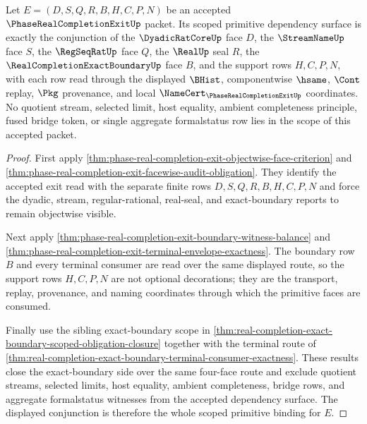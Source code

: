 \begin{theorem}
\label{thm:phase-real-completion-exit-scoped-primitive-dependency-binding}
Let $E=(D,S,Q,R,B,H,C,P,N)$ be an accepted $\PhaseRealCompletionExitUp$ packet. Its scoped primitive dependency surface is exactly the conjunction of the $\DyadicRatCoreUp$ face $D$, the $\StreamNameUp$ face $S$, the $\RegSeqRatUp$ face $Q$, the $\RealUp$ seal $R$, the $\RealCompletionExactBoundaryUp$ face $B$, and the support rows $H,C,P,N$, with each row read through the displayed $\BHist$, componentwise $\hsame$, $\Cont$ replay, $\Pkg$ provenance, and local $\NameCert_{\PhaseRealCompletionExitUp}$ coordinates. No quotient stream, selected limit, host equality, ambient completeness principle, fused bridge token, or single aggregate formalstatus row lies in the scope of this accepted packet.
\end{theorem}
\begin{proof}
First apply \autoref{thm:phase-real-completion-exit-objectwise-face-criterion} and \autoref{thm:phase-real-completion-exit-facewise-audit-obligation}. They identify the accepted exit read with the separate finite rows $D,S,Q,R,B,H,C,P,N$ and force the dyadic, stream, regular-rational, real-seal, and exact-boundary reports to remain objectwise visible.

Next apply \autoref{thm:phase-real-completion-exit-boundary-witness-balance} and \autoref{thm:phase-real-completion-exit-terminal-envelope-exactness}. The boundary row $B$ and every terminal consumer are read over the same displayed route, so the support rows $H,C,P,N$ are not optional decorations; they are the transport, replay, provenance, and naming coordinates through which the primitive faces are consumed.

Finally use the sibling exact-boundary scope in \autoref{thm:real-completion-exact-boundary-scoped-obligation-closure} together with the terminal route of \autoref{thm:real-completion-exact-boundary-terminal-consumer-exactness}. These results close the exact-boundary side over the same four-face route and exclude quotient streams, selected limits, host equality, ambient completeness, bridge rows, and aggregate formalstatus witnesses from the accepted dependency surface. The displayed conjunction is therefore the whole scoped primitive binding for $E$.
\end{proof}


